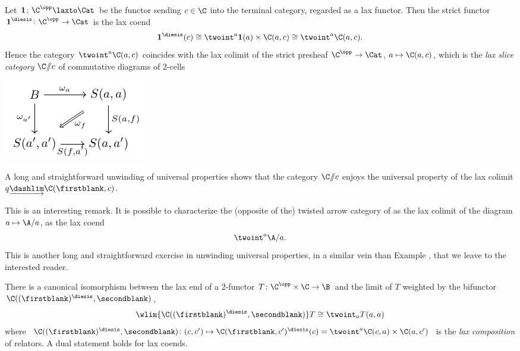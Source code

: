 \begin{example}
Let $\textbf{1}\colon \C^\opp\laxto \Cat$ be the functor sending $c\in\C$ into the terminal category, regarded as a lax functor. Then the strict functor $\textbf{1}^\diesis \colon \C^\opp\to \Cat$ is the lax coend
\[
\textbf{1}^\diesis(c) \cong \twoint^a \textbf{1}(a)\times \C(a,c)\cong \twoint^a \C(a,c).
\] 
Hence the category $\twoint^a \C(a,c)$ coincides with the lax colimit of the strict presheaf $\C^\opp\to \Cat$, $a\mapsto \C(a,c)$, which is \cite[p\@. \textbf{171}]{Street19} the \emph{lax slice category} $\C/\!\!/c$ of commutative diagrams of 2-cells
\begin{center}
\includegraphics[scale=1]{figures/fig14}
\end{center}
A long and straightforward unwinding of universal properties shows that the category $\C/\!\!/c$ enjoys the universal property of the lax colimit $q\underrightarrow{\dashlim}\C(\firstblank,c)$.
\end{example}
\begin{remark}
This is an interesting remark. It is possible to characterize the (opposite of the) twisted arrow category of \adef{} as the lax colimit of the diagram $a\mapsto \A/a$, \ie as the lax coend
\[
\twoint^a \A/a.
\]
This is another long and straightforward exercise in unwinding universal properties, in a similar vein than Example , that we leave to the interested reader.
\end{remark}
\begin{proposition}\label{lax.is.wcolim}
\cite[\S\textbf{2}]{bozapalides1980some} There is a canonical isomorphism between the lax end of a 2-functor $T\colon \C^\opp\times \C\to \B$ and the limit of $T$ weighted by the bifunctor $\C((\firstblank)^\diesis,\secondblank)$, \ie
\[
\wlim{\C((\firstblank)^\diesis,\secondblank)}T \cong \twoint_a T(a,a)
\]
where $\C((\firstblank)^\diesis,\secondblank)\colon (c, c')\mapsto \C(\firstblank,c')^\diesis(c)= \twoint^a \C(c,a)\times \C(a, c')$ is the \emph{lax composition} of relators. A dual statement holds for lax coends.
\end{proposition}
